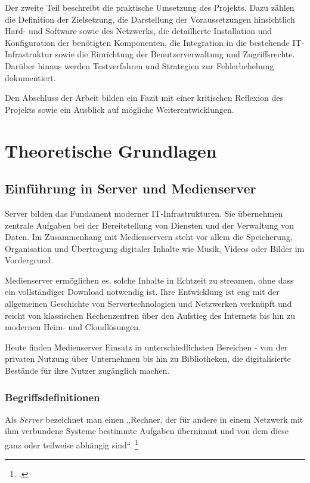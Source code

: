 \documentclass[12pt,a4paper]{report}
\begin{document}
Der zweite Teil beschreibt die praktische Umsetzung des Projekts. 
Dazu zählen die Definition der Zielsetzung, die Darstellung der Voraussetzungen hinsichtlich Hard- und Software sowie des Netzwerks, 
die detaillierte Installation und Konfiguration der benötigten Komponenten, 
die Integration in die bestehende IT-Infrastruktur sowie die Einrichtung der Benutzerverwaltung und Zugriffsrechte. 
Darüber hinaus werden Testverfahren und Strategien zur Fehlerbehebung dokumentiert.  

Den Abschluss der Arbeit bilden ein Fazit mit einer kritischen Reflexion des Projekts sowie ein Ausblick auf mögliche Weiterentwicklungen.

\chapter*{Theoretische Grundlagen}
\setcounter{section}{0}

\section{Einführung in Server und Medienserver}
Server bilden das Fundament moderner IT-Infrastrukturen.
Sie übernehmen zentrale Aufgaben bei der Bereitstellung von Diensten 
und der Verwaltung von Daten. 
Im Zusammenhang mit Medienservern steht vor allem die Speicherung, 
Organisation und Übertragung digitaler Inhalte wie Musik, 
Videos oder Bilder im Vordergrund. 

Medienserver ermöglichen es, solche Inhalte in Echtzeit zu streamen, 
ohne dass ein vollständiger Download notwendig ist. 
Ihre Entwicklung ist eng mit der allgemeinen Geschichte von Servertechnologien und Netzwerken verknüpft 
und reicht von klassischen Rechenzentren über den Aufstieg des Internets bis hin zu modernen Heim- und Cloudlösungen. 

Heute finden Medienserver Einsatz in unterschiedlichsten Bereichen - 
von der privaten Nutzung über Unternehmen bis hin zu Bibliotheken, 
die digitalisierte Bestände für ihre Nutzer zugänglich machen.

  \subsection{Begriffsdefinitionen}
  Als \emph{Server} bezeichnet man einen „Rechner, 
  der für andere in einem Netzwerk mit ihm verbundene Systeme bestimmte Aufgaben übernimmt 
  und von dem diese ganz oder teilweise abhängig sind“. \footcite{duden_server}
\end{document}
